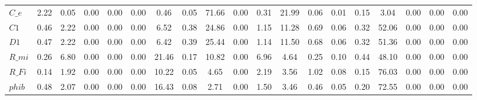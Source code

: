 \begin{center}
\begin{longtable}{lcccccccccccccccccc}
$C\_e               $	 & 	             2.22	 & 	             0.05	 & 	             0.00	 & 	             0.00	 & 	             0.00	 & 	             0.46	 & 	             0.05	 & 	            71.66	 & 	             0.00	 & 	             0.31	 & 	            21.99	 & 	             0.06	 & 	             0.01	 & 	             0.15	 & 	             3.04	 & 	             0.00	 & 	             0.00	 & 	             0.00 \\ 
$C1                 $	 & 	             0.46	 & 	             2.22	 & 	             0.00	 & 	             0.00	 & 	             0.00	 & 	             6.52	 & 	             0.38	 & 	            24.86	 & 	             0.00	 & 	             1.15	 & 	            11.28	 & 	             0.69	 & 	             0.06	 & 	             0.32	 & 	            52.06	 & 	             0.00	 & 	             0.00	 & 	             0.00 \\ 
$D1                 $	 & 	             0.47	 & 	             2.22	 & 	             0.00	 & 	             0.00	 & 	             0.00	 & 	             6.42	 & 	             0.39	 & 	            25.44	 & 	             0.00	 & 	             1.14	 & 	            11.50	 & 	             0.68	 & 	             0.06	 & 	             0.32	 & 	            51.36	 & 	             0.00	 & 	             0.00	 & 	             0.00 \\ 
$R\_mi              $	 & 	             0.26	 & 	             6.80	 & 	             0.00	 & 	             0.00	 & 	             0.00	 & 	            21.46	 & 	             0.17	 & 	            10.82	 & 	             0.00	 & 	             6.96	 & 	             4.64	 & 	             0.25	 & 	             0.10	 & 	             0.44	 & 	            48.10	 & 	             0.00	 & 	             0.00	 & 	             0.00 \\ 
$R\_Fi              $	 & 	             0.14	 & 	             1.92	 & 	             0.00	 & 	             0.00	 & 	             0.00	 & 	            10.22	 & 	             0.05	 & 	             4.65	 & 	             0.00	 & 	             2.19	 & 	             3.56	 & 	             1.02	 & 	             0.08	 & 	             0.15	 & 	            76.03	 & 	             0.00	 & 	             0.00	 & 	             0.00 \\ 
$phib               $	 & 	             0.48	 & 	             2.07	 & 	             0.00	 & 	             0.00	 & 	             0.00	 & 	            16.43	 & 	             0.08	 & 	             2.71	 & 	             0.00	 & 	             1.50	 & 	             3.46	 & 	             0.46	 & 	             0.05	 & 	             0.20	 & 	            72.55	 & 	             0.00	 & 	             0.00	 & 	             0.00 \\ 

\end{longtable}
\end{center}
